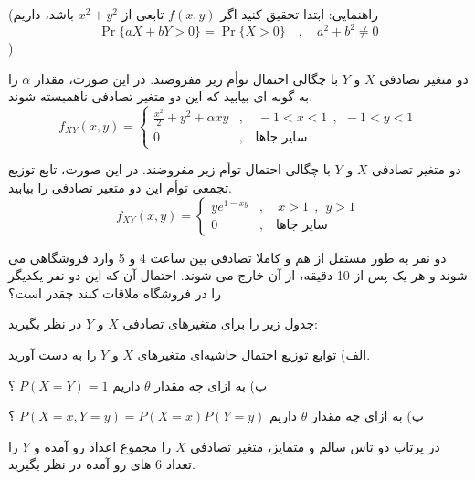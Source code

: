 (راهنمایی: ابتدا تحقیق کنید اگر $f(x,y)$ تابعی از $x^2+y^2$ باشد، داریم 
$$\Pr\{aX+bY>0\}=\Pr\{X>0\}\quad,\quad a^2+b^2\ne 0$$)


\Q
دو متغیر تصادفی $X$ و $Y$ با چگالی احتمال توأم زیر مفروضند. در این صورت، مقدار $\alpha$ را به گونه ای بیابید که این دو متغیر تصادفی ناهمبسته شوند.
$$
f_{XY}(x,y)=\begin{cases}
\frac{x^2}{2}+y^2+\alpha xy&,\quad -1<x<1\ \ ,\ \ -1<y<1\\
0&,\quad \text{سایر جاها}
\end{cases}
$$


\Q
دو متغیر تصادفی $X$ و $Y$ با چگالی احتمال توأم زیر مفروضند. در این صورت، تابع توزیع تجمعی توأم این دو متغیر تصادفی را بیابید.
$$
f_{XY}(x,y)=\begin{cases}
ye^{1-xy}&,\quad x>1\ \ ,\ \ y>1\\
0&,\quad \text{سایر جاها}
\end{cases}
$$


\Q
دو نفر به طور مستقل از هم و کاملا تصادفی بین ساعت 4 و 5 وارد فروشگاهی می شوند و هر یک پس از 10 دقیقه، از آن خارج می شوند. احتمال آن که این دو نفر یکدیگر را در فروشگاه ملاقات کنند چقدر است؟


\Q
جدول زیر را برای متغیرهای تصادفی $X$ و $Y$ در نظر بگیرید:
\begin{table}[h]
\centering
\Large
{}
\end{table}

الف) توابع توزیع احتمال حاشیه‌ای متغیرهای $X$ و $Y$ را به دست آورید.

ب) به ازای چه مقدار $\theta$ داریم
$
P(X=Y)=1
$
؟

پ) به ازای چه مقدار $\theta$ داریم
$
P(X=x,Y=y)=P(X=x)P(Y=y)
$
؟


\Q
در پرتاب دو تاس سالم و متمایز، متغیر تصادفی $X$ را مجموع اعداد رو آمده و $Y$ را تعداد 6 های رو آمده در نظر بگیرید.

